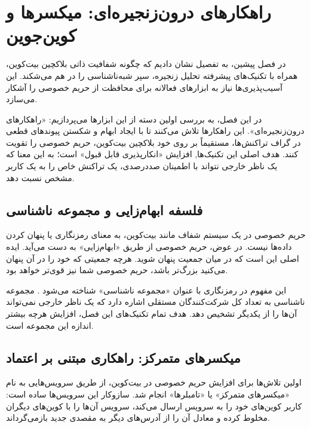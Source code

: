 \chapter{راهکارهای درون‌زنجیره‌ای: میکسرها و کوین‌جوین}
\label{chap:onchain_solutions}

در فصل پیشین، به تفصیل نشان دادیم که چگونه شفافیت ذاتی بلاکچین بیت‌کوین، همراه با تکنیک‌های پیشرفته تحلیل زنجیره، سپر شبه‌ناشناسی را در هم می‌شکند. این آسیب‌پذیری‌ها نیاز به ابزارهای فعالانه برای محافظت از حریم خصوصی را آشکار می‌سازد.

در این فصل، به بررسی اولین دسته از این ابزارها می‌پردازیم: «راهکارهای درون‌زنجیره‌ای». این راهکارها تلاش می‌کنند تا با ایجاد ابهام و شکستن پیوندهای قطعی در گراف تراکنش‌ها، مستقیماً بر روی خود بلاکچین بیت‌کوین، حریم خصوصی را تقویت کنند. هدف اصلی این تکنیک‌ها, افزایش «انکارپذیری قابل قبول» است؛ به این معنا که یک ناظر خارجی نتواند با اطمینان صددرصدی، یک تراکنش خاص را به یک کاربر مشخص نسبت دهد.

\section{فلسفه ابهام‌زایی و مجموعه ناشناسی}

حریم خصوصی در یک سیستم شفاف مانند بیت‌کوین، به معنای رمزنگاری یا پنهان کردن داده‌ها نیست. در عوض، حریم خصوصی از طریق «ابهام‌زایی» به دست می‌آید. ایده اصلی این است که در میان جمعیت پنهان شوید. هرچه جمعیتی که خود را در آن پنهان می‌کنید بزرگ‌تر باشد، حریم خصوصی شما نیز قوی‌تر خواهد بود.

این مفهوم در رمزنگاری با عنوان «مجموعه ناشناسی» شناخته می‌شود \cite{narayanan_deanonymizing}. مجموعه ناشناسی به تعداد کل شرکت‌کنندگان مستقلی اشاره دارد که یک ناظر خارجی نمی‌تواند آن‌ها را از یکدیگر تشخیص دهد. هدف تمام تکنیک‌های این فصل، افزایش هرچه بیشتر اندازه این مجموعه است.

\section{میکسرهای متمرکز: راهکاری مبتنی بر اعتماد}

اولین تلاش‌ها برای افزایش حریم خصوصی در بیت‌کوین، از طریق سرویس‌هایی به نام «میکسرهای متمرکز» یا «تامبلرها» انجام شد. سازوکار این سرویس‌ها ساده است: کاربر کوین‌های خود را به سرویس ارسال می‌کند، سرویس آن‌ها را با کوین‌های دیگران مخلوط کرده و معادل آن را از آدرس‌های دیگر به مقصدی جدید بازمی‌گرداند.

